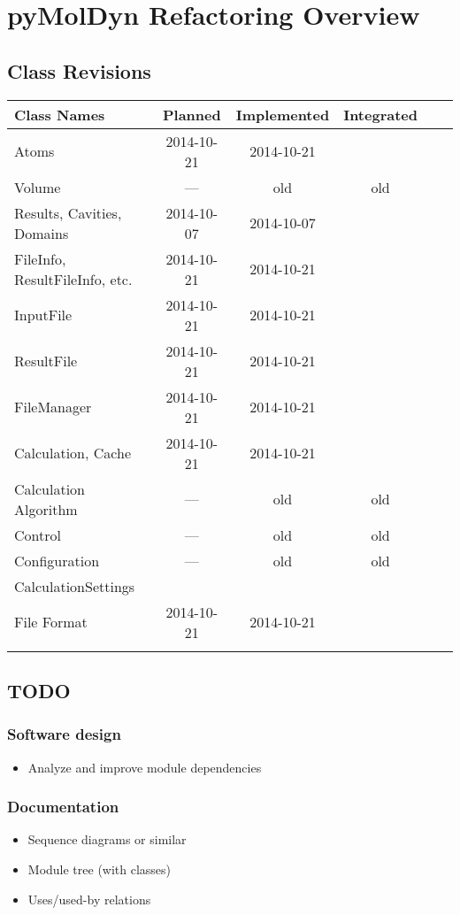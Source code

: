 \documentclass[final, oneside, a4paper, 11pt, pdftex, english]{scrreprt}
\begin{document}
\chapter*{pyMolDyn Refactoring Overview}
\section*{Class Revisions}

\begin{tabular}{|l|c|c|c|c|c|}
    \hline
    \textbf{Class Names} & \textbf{Planned} & \textbf{Implemented} & \textbf{Integrated} \\
    \hline
    Atoms & 2014-10-21 & 2014-10-21 & \\
    \hline
    Volume & --- & old & old \\
    \hline
    Results, Cavities, Domains & 2014-10-07 & 2014-10-07 & \\
    \hline
    FileInfo, ResultFileInfo, etc. & 2014-10-21 & 2014-10-21 & \\
    \hline
    InputFile & 2014-10-21 & 2014-10-21 & \\
    \hline
    ResultFile & 2014-10-21 & 2014-10-21 & \\
    \hline
    FileManager & 2014-10-21 & 2014-10-21 & \\
    \hline
    Calculation, Cache & 2014-10-21 & 2014-10-21 & \\
    \hline
    Calculation Algorithm & --- & old & old \\
    \hline
    Control & --- & old & old \\
    \hline
    Configuration & --- & old & old \\
    \hline
    CalculationSettings & & & \\
    \hline
    File Format & 2014-10-21 & 2014-10-21 & \\
    \hline
    & & & \\
    \hline
\end{tabular}


\section*{TODO}
\subsection*{Software design}
\begin{itemize}\itemsep0pt
    \item Analyze and improve module dependencies
\end{itemize}


\subsection*{Documentation}
\begin{itemize}\itemsep0pt
    \item Sequence diagrams or similar
    \item Module tree (with classes)
    \item Uses/used-by relations
\end{itemize}
\end{document}
